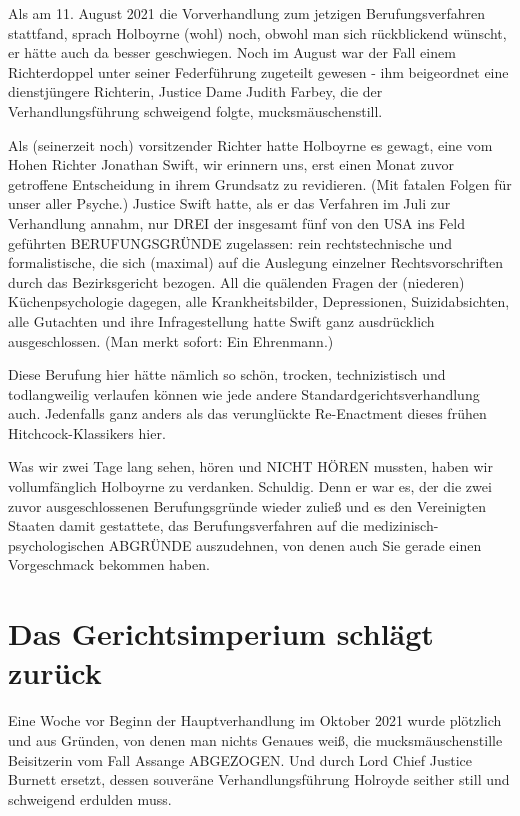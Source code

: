 \begin{multicols}{2}
Als am 11. August 2021 die Vorverhandlung zum jetzigen
Berufungsverfahren stattfand, sprach Holboyrne (wohl)
noch, obwohl man sich rückblickend wünscht, er hätte
auch da besser geschwiegen. Noch im August war der
Fall einem Richterdoppel unter seiner Federführung zugeteilt gewesen - ihm beigeordnet eine dienstjüngere
Richterin, Justice Dame Judith Farbey, die der Verhandlungsführung schweigend folgte, mucksmäuschenstill.

Als (seinerzeit noch) vorsitzender Richter hatte Holboyrne es gewagt, eine vom Hohen Richter Jonathan Swift,
wir erinnern uns, erst einen Monat zuvor getroffene Entscheidung in ihrem Grundsatz zu revidieren. (Mit fatalen Folgen für unser aller Psyche.) Justice Swift hatte, als
er das Verfahren im Juli zur Verhandlung annahm, nur
DREI der insgesamt fünf von den USA ins Feld geführten BERUFUNGSGRÜNDE zugelassen: rein rechtstechnische und formalistische, die sich (maximal) auf die
Auslegung einzelner Rechtsvorschriften durch das Bezirksgericht bezogen. All die quälenden Fragen der (niederen) Küchenpsychologie dagegen, alle Krankheitsbilder, Depressionen, Suizidabsichten, alle Gutachten und
ihre Infragestellung hatte Swift ganz ausdrücklich ausgeschlossen. (Man merkt sofort: Ein Ehrenmann.)

Diese Berufung hier hätte nämlich so schön, trocken,
technizistisch und todlangweilig verlaufen können wie
jede andere Standardgerichtsverhandlung auch. Jedenfalls ganz anders als das verunglückte Re-Enactment
dieses frühen Hitchcock-Klassikers hier.

Was wir zwei Tage lang sehen, hören und NICHT HÖREN mussten, haben wir vollumfänglich Holboyrne zu
verdanken. Schuldig. Denn er war es, der die zwei zuvor
ausgeschlossenen Berufungsgründe wieder zuließ und
es den Vereinigten Staaten damit gestattete, das Berufungsverfahren auf die medizinisch-psychologischen
ABGRÜNDE auszudehnen, von denen auch Sie gerade
einen Vorgeschmack bekommen haben.


\chapter{Das Gerichtsimperium schlägt zurück}
Eine Woche vor Beginn der Hauptverhandlung im Oktober 2021 wurde plötzlich und aus Gründen, von denen
man nichts Genaues weiß, die mucksmäuschenstille
Beisitzerin vom Fall Assange ABGEZOGEN. Und durch
Lord Chief Justice Burnett ersetzt, dessen souveräne Verhandlungsführung Holroyde seither still und schweigend erdulden muss.


\end{multicols}
